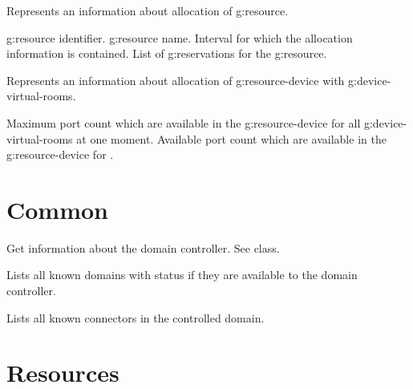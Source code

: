 \begin{Api}
Represents an information about allocation of \gls{g:resource}.
\begin{ApiClassAttributes}
 \Gls{g:resource} identifier.
 \Gls{g:resource} name.
 Interval for which the allocation information is contained.
 List of \glspl{g:reservation} for the \gls{g:resource}.
\end{ApiClassAttributes}

Represents an information about allocation of \gls{g:resource-device} with \glspl{g:device-virtual-room}.
\begin{ApiClassAttributes}
 Maximum port count which are available in the \Gls{g:resource-device} for all \glspl{g:device-virtual-room} at one moment.
 Available port count which are available in the \Gls{g:resource-device} for .
\end{ApiClassAttributes}


\end{Api}

\section{Common}

\begin{Api}

Get information about the domain controller. See  class.

Lists all known domains with status if they are available to the domain controller.

Lists all known connectors in the controlled domain.

\end{Api}


\section{Resources}

